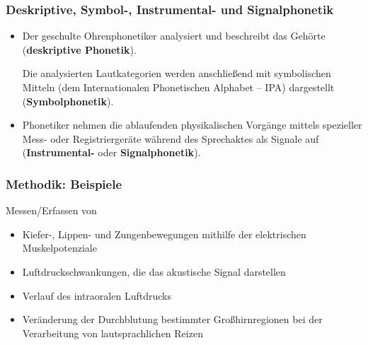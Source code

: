

		
	


\begin{frame}
\frametitle{Deskriptive, Symbol-, Instrumental- und Signalphonetik}

	\begin{itemize}
		\item Der geschulte Ohrenphonetiker analysiert und beschreibt das Gehörte
                  (\textbf{deskriptive Phonetik}).

                  Die analysierten Lautkategorien werden anschließend mit symbolischen Mitteln (dem Internationalen Phonetischen Alphabet -- IPA) dargestellt (\textbf{Symbolphonetik}).

		\item Phonetiker nehmen die ablaufenden physikalischen Vorgänge mittels spezieller Mess- oder Registriergeräte während des Sprechaktes als Signale auf (\textbf{Instrumental-} oder \textbf{Signalphonetik}).
	\end{itemize}
	
\end{frame}


\begin{frame}
\frametitle{Methodik: Beispiele}

Messen/Erfassen von
	\begin{itemize}
\item Kiefer-, Lippen- und Zungenbewegungen mithilfe der elektrischen Muskelpotenziale
\item Luftdruckschwankungen, die das akustische Signal darstellen
\item Verlauf des intraoralen Luftdrucks
\item Veränderung der Durchblutung bestimmter Großhirnregionen bei der Verarbeitung von lautsprachlichen Reizen
	\end{itemize}	
\end{frame}



